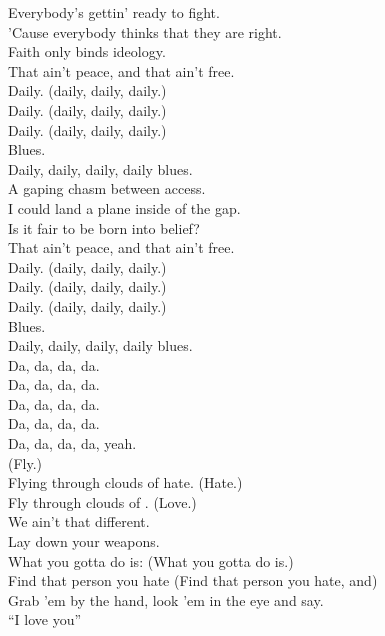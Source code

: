 

Everybody's gettin' ready to fight. \\
'Cause everybody thinks that they are right. \\
Faith only binds ideology. \\
That ain't peace, and that ain't free. \\
Daily. (daily, daily, daily.) \\
Daily. (daily, daily, daily.) \\
Daily. (daily, daily, daily.) \\
Blues. \\
Daily, daily, daily, daily blues. \\

A gaping chasm between access. \\
I could land a plane inside of the gap. \\
Is it fair to be born into belief? \\
That ain't peace, and that ain't free. \\
Daily. (daily, daily, daily.) \\
Daily. (daily, daily, daily.) \\
Daily. (daily, daily, daily.) \\
Blues. \\
Daily, daily, daily, daily blues. \\

Da, da, da, da. \\
Da, da, da, da. \\
Da, da, da, da. \\
Da, da, da, da. \\
Da, da, da, da, yeah. \\

(Fly.) \\
Flying through clouds of hate. (Hate.) \\
Fly through clouds of . (Love.) \\
We ain't that different. \\
Lay down your weapons. \\
What you gotta do is: (What you gotta do is.) \\
Find that person you hate (Find that person you hate, and) \\
Grab 'em by the hand, look 'em in the eye and say. \\
``I love you'' \\

